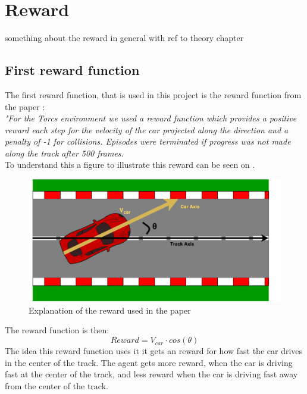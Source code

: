 \section{Reward}
something about the reward in general with ref to theory chapter

\subsection{First reward function}
The first reward function, that is used in this project is the reward function from the paper \cite{DBLP:journals/corr/LillicrapHPHETS15}: \\
\textit{"For the Torcs environment we used a reward function which provides a positive reward each step for the velocity of the car projected along the direction and a penalty of -1 for collisions. Episodes were terminated if progress was not made along the track after 500 frames.}\\
To understand this a figure to illustrate this reward can be seen on .

\begin{figure}[H]
	\centering
	\includegraphics[width=1\textwidth]{Figures/Result/Reward_paper.pdf}
	\caption{Explanation of the reward used in the paper \cite{DBLP:journals/corr/LillicrapHPHETS15} }
	\label{fig:Reward_paper}
\end{figure}

The reward function is then:
\begin{equation}
Reward = V_{car} \cdot cos(\theta) 
\end{equation}
The idea this reward function uses it it gets an reward for how fast the car drives in the center of the track. The agent gets more reward, when the car is driving fast at the center of the track, and less reward when the car is driving fast away from the center of the track. 

